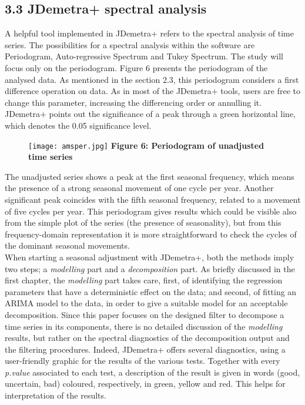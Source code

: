 \documentclass{article}
\begin{document}
\subsection*{\small 3.3 JDemetra+ spectral analysis}
A helpful tool implemented in JDemetra+ refers to the spectral analysis of time series. The possibilities for a spectral analysis within the software are Periodogram, Auto-regressive Spectrum and Tukey Spectrum. The study will focus only on the periodogram. Figure 6 presents the periodogram of the analysed data. As mentioned in the section 2.3, this periodogram considers a first difference operation on data. As in most of the JDemetra+ tools, users are free to change this parameter, increasing the differencing order or annulling it. JDemetra+ points out the significance of a peak through a green horizontal line, which denotes the 0.05 significance level.
\begin{figure}[H]
\centering
  \texttt{[image: amsper.jpg]}
  {\textbf{\scriptsize Figure 6: Periodogram of unadjusted time series}}
  \label{fig:1}
\end{figure}
The unadjusted series shows a peak at the first seasonal frequency, which means the presence of a strong seasonal movement of one cycle per year. Another significant peak coincides with the fifth seasonal frequency, related to a movement of five cycles per year. This periodogram gives results which could be visible also from the simple plot of the series (the presence of seasonality), but from this frequency-domain representation it is more straightforward to check the cycles of the dominant seasonal movements.\\When starting a seasonal adjustment with JDemetra+, both the methods imply two steps; a \textit{modelling} part and a \textit{decomposition} part. As briefly discussed in the first chapter, the \textit{modelling} part takes care, first, of identifying the regression parameters that have a deterministic effect on the data; and second, of fitting an ARIMA model to the data, in order to give a suitable model for an acceptable decomposition. Since this paper focuses on the designed filter to decompose a time series in its components, there is no detailed discussion of the \textit{modelling} results, but rather on the spectral diagnostics of the decomposition output and the filtering procedures. Indeed, JDemetra+ offers several diagnostics, using a user-friendly graphic for the results of the various tests. Together with every \textit{p.value} associated to each test, a description of the result is given in words (good, uncertain, bad) coloured, respectively, in green, yellow and red. This helps for interpretation of the results.
\end{document}
